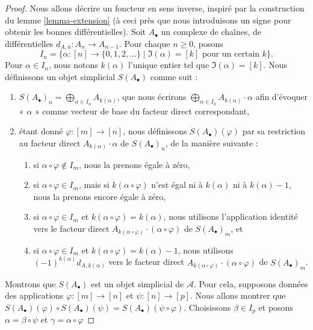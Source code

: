 \begin{proof}
Nous allons décrire un foncteur en sens inverse,
inspiré par la construction du lemme \ref{lemma-extension}
(à ceci près que nous introduisons un signe pour obtenir les bonnes
différentielles). Soit $A_\bullet$ un complexe de chaînes, de différentielles
$d_{A, n} : A_n \to A_{n - 1}$. Pour chaque $n \geq 0$, posons
$$
I_n =
\Big\{
\alpha : [n] \to \{0, 1, 2, \ldots\}
\mid
\Im(\alpha) = [k]\text{ pour un certain }k
\Big\}.
$$
Pour $\alpha \in I_n$, nous notons $k(\alpha)$ l'unique
entier tel que $\Im(\alpha) = [k]$.
Nous définissons un objet simplicial $S(A_\bullet)$ comme suit :
\begin{enumerate}
\item $S(A_\bullet)_n = \bigoplus_{\alpha \in I_n} A_{k(\alpha)}$, que
nous écrirons
$\bigoplus_{\alpha \in I_n} A_{k(\alpha)} \cdot \alpha$
afin d'évoquer « $\alpha$ » comme vecteur de base du
facteur direct correspondant,
\item étant donné $\varphi : [m] \to [n]$, nous définissons
$S(A_\bullet)(\varphi)$ par sa restriction au
facteur direct $A_{k(\alpha)} \cdot \alpha$
de $S(A_\bullet)_n$, de la manière suivante :
\begin{enumerate}
\item si $\alpha \circ \varphi \not \in I_m$, nous la prenons égale à zéro,
\item si $\alpha \circ \varphi \in I_m$, mais si $k(\alpha \circ \varphi)$
n'est égal ni à $k(\alpha)$ ni à $k(\alpha) - 1$, nous la prenons
encore égale à zéro,
\item si $\alpha \circ \varphi \in I_m$
et $k(\alpha \circ \varphi) = k(\alpha)$, nous utilisons
l'application identité vers le facteur direct
$A_{k(\alpha \circ \varphi)} \cdot (\alpha \circ \varphi)$
de $S(A_\bullet)_m$, et
\item si $\alpha \circ \varphi \in I_m$
et $k(\alpha \circ \varphi) = k(\alpha) - 1$,
nous utilisons $(-1)^{k(\alpha)} d_{A, k(\alpha)}$ vers le facteur direct
$A_{k(\alpha \circ \varphi)}\cdot (\alpha \circ \varphi)$
de $S(A_\bullet)_m$.
\end{enumerate}
\end{enumerate}
Montrons que $S(A_\bullet)$ est un objet simplicial de $\mathcal{A}$.
Pour cela, supposons données des applications $\varphi : [m] \to [n]$ et
$\psi : [n] \to [p]$. Nous allons montrer que
$S(A_\bullet)(\varphi) \circ S(A_\bullet)(\psi) =
S(A_\bullet)(\psi \circ \varphi)$. Choisissons $\beta \in I_p$ et posons
$\alpha = \beta \circ \psi$ et $\gamma = \alpha \circ \varphi$

\end{proof}
